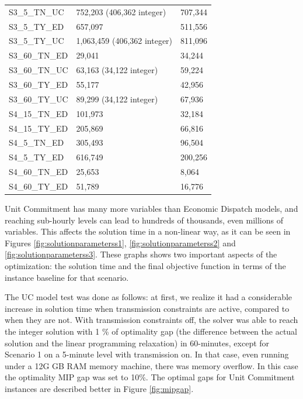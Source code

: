 \documentclass[12pt,LUDisStyle,twosided]{book}
\begin{document}
\begin{table}[H]
{\begin{tabular}{|l|l|l|}
S3\_5\_TN\_UC&752,203 (406,362 integer)&707,344\\
S3\_5\_TY\_ED&657,097&511,556\\
S3\_5\_TY\_UC&1,063,459 (406,362 integer)&811,096\\
S3\_60\_TN\_ED&29,041&34,244\\
S3\_60\_TN\_UC&63,163 (34,122 integer)&59,224\\
S3\_60\_TY\_ED&55,177&42,956\\
S3\_60\_TY\_UC&89,299 (34,122 integer)&67,936\\
S4\_15\_TN\_ED&101,973&32,184\\
S4\_15\_TY\_ED&205,869&66,816\\
S4\_5\_TN\_ED&305,493&96,504\\
S4\_5\_TY\_ED&616,749&200,256\\
S4\_60\_TN\_ED&25,653&8,064\\
S4\_60\_TY\_ED&51,789&16,776\\
\hline
\end{tabular}
}
\label{table:modelparameters}
\end{table}

Unit Commitment has many more variables than Economic Dispatch models, and reaching sub-hourly levels can lead to hundreds of thousands, even millions of variables. This affects the solution time in a non-linear way, as it can be seen in Figures \ref{fig:solutionparameterss1}, \ref{fig:solutionparameterss2} and \ref{fig:solutionparameterss3}. These graphs shows two important aspects of the optimization: the solution time and the final objective function in terms of the instance baseline for that scenario.

The UC model test was done as follows: at first, we realize it had a considerable increase in solution time when transmission constraints are active, compared to when they are not. With transmission constraints off, the solver was able to reach the integer solution with 1 \% of optimality gap (the difference between the actual solution and the linear programming relaxation) in 60-minutes, except for Scenario 1 on a 5-minute level with transmission on. In that case, even running under a 12G GB RAM memory machine, there was memory overflow. In this case the optimality MIP gap was set to 10\%. The optimal gaps for Unit Commitment instances are described better in Figure \ref{fig:mipgap}.
\end{document}
